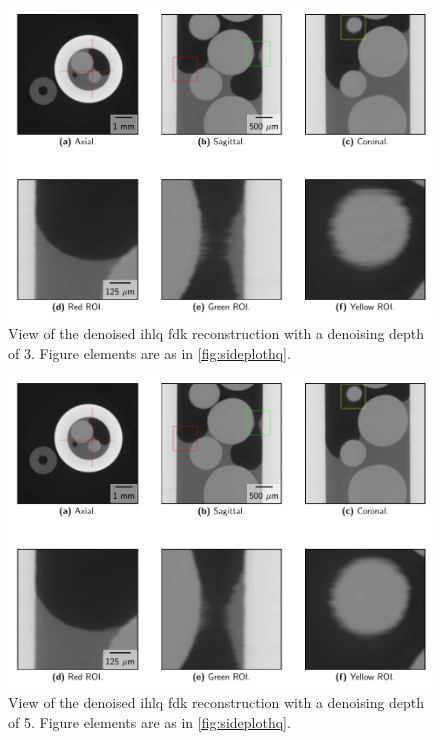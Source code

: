 \begin{figure}[htbp]
  \centering
  \includegraphics[width=.9\textwidth]{figures/kimrobertdepth3-x475y620s250.pdf}
  \caption[View of IHLQ FDK denoised with a depth of 3]{View of the denoised \gls{ihlq} \gls{fdk} reconstruction with a denoising depth of 3. Figure elements are as in \cref{fig:sideplothq}. }
  \label{fig:sideplotdepth3}
\end{figure}

\begin{figure}[htbp]
  \centering
  \includegraphics[width=.9\textwidth]{figures/kimrobertdepth5-x475y620s250.pdf}
  \caption[View of IHLQ FDK denoised with a depth of 5]{View of the denoised \gls{ihlq} \gls{fdk} reconstruction with a denoising depth of 5. Figure elements are as in \cref{fig:sideplothq}. }
  \label{fig:sideplotdepth5}
\end{figure}

